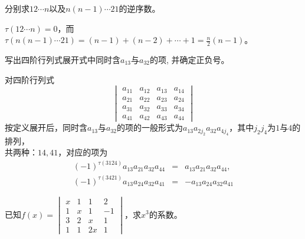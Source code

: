 
\begin{eg}
分别求$12\cdots n$以及$n(n-1)\cdots 21$的逆序数。
\end{eg}

\begin{solution}
$\tau(12\cdots n) = 0$，而$\tau(n(n-1)\cdots 21) = (n-1)+(n-2)+\cdots+1 = \frac{n}{2}(n-1)$。
\end{solution}

\begin{eg}
写出四阶行列式展开式中同时含$a_{13}$与$a_{32}$的项, 并确定正负号。
\end{eg}

\begin{solution}
对四阶行列式
$$
\begin{vmatrix}
a_{11} & a_{12} & a_{13} & a_{14} \\ a_{21} & a_{22} & a_{23} & a_{24} \\ a_{31} & a_{32} & a_{33} & a_{34} \\ a_{41} & a_{42} & a_{43} & a_{44}
\end{vmatrix}
$$
按定义展开后，同时含$a_{13}$与$a_{32}$的项的一般形式为$a_{13}a_{2j_2}a_{32}a_{4j_4}$，其中$j_2j_4$为$1$与$4$的排列，\\
共两种：$14,41$，对应的项为
$$\begin{array}{rcl}
(-1)^{\tau(3124)} a_{13}a_{21}a_{32}a_{44} & = &  a_{13}a_{21}a_{32}a_{44}, \\
(-1)^{\tau(3421)} a_{13}a_{24}a_{32}a_{41} & = &  -a_{13}a_{24}a_{32}a_{41}
\end{array}$$
\end{solution}

\begin{eg}
已知$f(x) = \begin{vmatrix}
x & 1 & 1 & 2 \\ 1 & x & 1 & -1 \\ 3 & 2 & x & 1 \\ 1 & 1 & 2x & 1
\end{vmatrix}$，求$x^3$的系数。
\end{eg}


